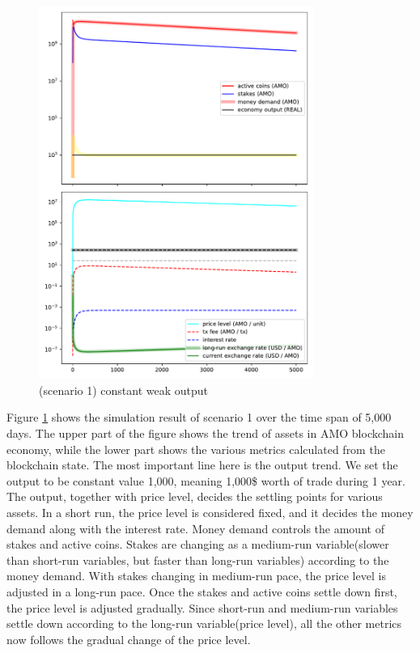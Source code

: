 \documentclass[a4paper,11pt]{scrartcl}
\begin{document}
\begin{figure}[hbt!]
	\centering
	\includegraphics[width=0.8\textwidth]{fig/fig1.pdf}
	\caption{(scenario 1) constant weak output}
	\label{fig:sc1}
\end{figure}

Figure \ref{fig:sc1} shows the simulation result of scenario 1 over the time
span of 5,000 days. The upper part of the figure shows the trend of assets in
AMO blockchain economy, while the lower part shows the various metrics
calculated from the blockchain state. The most important line here is the
output trend. We set the output to be constant value 1,000, meaning 1,000\$
worth of trade during 1 year. The output, together with price level, decides
the settling points for various assets. In a short run, the price level is
considered fixed, and it decides the money demand along with the interest rate.
Money demand controls the amount of stakes and active coins. Stakes are
changing as a medium-run variable(slower than short-run variables, but faster
than long-run variables) according to the money demand. With stakes changing in
medium-run pace, the price level is adjusted in a long-run pace. Once the
stakes and active coins settle down first, the price level is adjusted
gradually. Since short-run and medium-run variables settle down according to
the long-run variable(price level), all the other metrics now follows the
gradual change of the price level.
\end{document}
